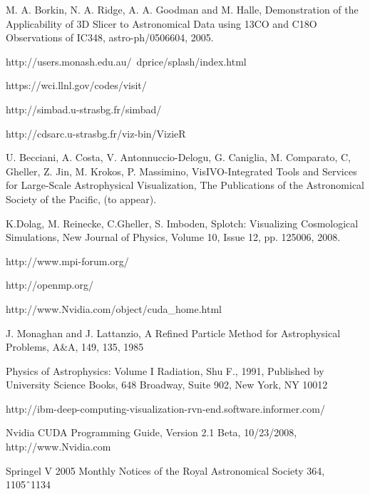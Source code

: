 \documentclass[1p,times]{elsarticle}
\begin{document}
\begin{thebibliography}{00}
 M. A. Borkin, N. A. Ridge, A. A. Goodman and M. Halle, Demonstration of the Applicability of 3D Slicer to Astronomical Data using 13CO and C18O Observations of IC348, astro-ph/0506604, 2005.

 http://users.monash.edu.au/~dprice/splash/index.html

 https://wci.llnl.gov/codes/visit/

 http://simbad.u-strasbg.fr/simbad/

 http://cdsarc.u-strasbg.fr/viz-bin/VizieR

U. Becciani, A. Costa, V. Antonnuccio-Delogu, G. Caniglia, M. Comparato, C, Gheller, Z. Jin, M. Krokos, P. Massimino, VisIVO-Integrated Tools and Services for Large-Scale Astrophysical Visualization, The Publications of the Astronomical Society of the Pacific, (to appear).

K.Dolag, M. Reinecke, C.Gheller, S. Imboden, Splotch: Visualizing Cosmological Simulations, New Journal of Physics, Volume 10, Issue 12, pp. 125006, 2008.

 http://www.mpi-forum.org/

 http://openmp.org/

 http://www.Nvidia.com/object/cuda\_home.html

 J. Monaghan and J. Lattanzio, A Refined Particle Method for Astrophysical Problems, A\&A, 149, 135, 1985

 Physics of Astrophysics: Volume I Radiation, Shu F., 1991,
Published by University Science Books, 648 Broadway, Suite 902, New York, NY 10012

 http://ibm-deep-computing-visualization-rvn-end.software.informer.com/

 Nvidia CUDA Programming Guide, Version 2.1 Beta, 10/23/2008, http://www.Nvidia.com

 Springel V 2005 Monthly Notices of the Royal Astronomical Society 364, 1105ˆ1134

\end{thebibliography}
\end{document}
